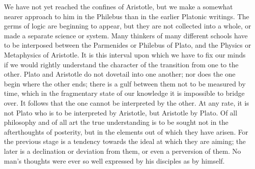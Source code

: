 \documentclass[11pt,letter]{article}
\begin{document}
\par  We have not yet reached the confines of Aristotle, but we make a somewhat nearer approach to him in the Philebus than in the earlier Platonic writings. The germs of logic are beginning to appear, but they are not collected into a whole, or made a separate science or system. Many thinkers of many different schools have to be interposed between the Parmenides or Philebus of Plato, and the Physics or Metaphysics of Aristotle. It is this interval upon which we have to fix our minds if we would rightly understand the character of the transition from one to the other. Plato and Aristotle do not dovetail into one another; nor does the one begin where the other ends; there is a gulf between them not to be measured by time, which in the fragmentary state of our knowledge it is impossible to bridge over. It follows that the one cannot be interpreted by the other. At any rate, it is not Plato who is to be interpreted by Aristotle, but Aristotle by Plato. Of all philosophy and of all art the true understanding is to be sought not in the afterthoughts of posterity, but in the elements out of which they have arisen. For the previous stage is a tendency towards the ideal at which they are aiming; the later is a declination or deviation from them, or even a perversion of them. No man's thoughts were ever so well expressed by his disciples as by himself.
\end{document}
